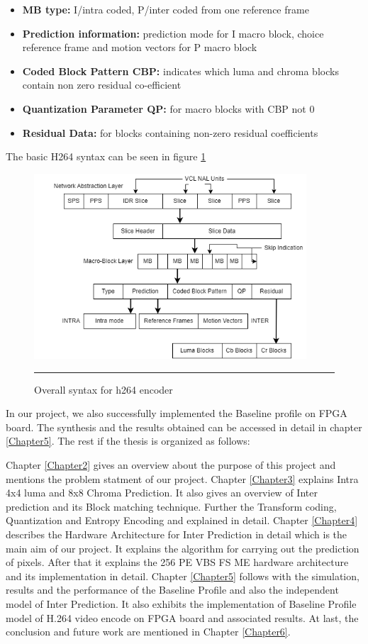 \begin{itemize}
	\item \textbf{MB type:} I/intra coded, P/inter coded from one reference frame
	\item \textbf{Prediction information:} prediction mode for I macro block, choice reference frame and motion vectors for P macro block
	\item \textbf{Coded Block Pattern CBP:} indicates which luma and chroma blocks contain non zero residual co-efficient
	\item \textbf{Quantization Parameter QP:} for macro blocks with CBP not 0
	\item \textbf{Residual Data:} for blocks containing non-zero residual coefficients
\end{itemize}

The basic H264 syntax can be seen in figure \ref{fig:syntax}
\begin{figure}[H]
	\centering
	\includegraphics[width = 4in]{./Figures/syntax.png}
	\rule{35em}{0.5pt}
	\caption{Overall syntax for h264 encoder}
	\label{fig:syntax}
\end{figure}

In our project, we also successfully implemented the Baseline profile on FPGA board. The synthesis and the results obtained can be accessed in detail in chapter \ref{Chapter5}. The rest if the thesis is organized as follows:

Chapter \ref{Chapter2} gives an overview about the purpose of this project and mentions the problem statment of our project. Chapter \ref{Chapter3} explains Intra 4x4 luma and 8x8 Chroma Prediction. It also gives an overview of Inter prediction and its Block matching technique. Further the Transform coding, Quantization and Entropy Encoding and explained in detail. Chapter \ref{Chapter4} describes the Hardware Architecture for Inter Prediction in detail which is the main aim of our project. It explains the algorithm for carrying out the prediction of pixels. After that it explains the 256 PE VBS FS ME hardware architecture and its implementation in detail. Chapter \ref{Chapter5} follows with the simulation, results and the performance of the Baseline Profile and also the independent model of Inter Prediction. It also exhibits the implementation of Baseline Profile model of H.264 video encode on FPGA board and associated results. At last, the conclusion and future work are mentioned in Chapter \ref{Chapter6}. 